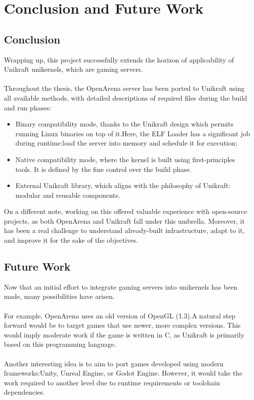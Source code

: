 \chapter{Conclusion and Future Work}
\label{chapter:fw&ll}
\section{Conclusion}
Wrapping up, this project successfully extends the horizon of applicability of Unikraft unikernels, which are gaming servers. \\ \\
Throughout the thesis, the OpenArena server has been ported to Unikraft using all available methods, with detailed descriptions of required files
during the build and run phases:
\begin{itemize}
    \item Binary compatibility mode, thanks to the Unikraft design which permits running Linux binaries on top of it.\@ Here,
    the ELF Loader has a significant job during runtime:\@ load the server into memory and schedule it for execution;
    \item Native compatibility mode, where the kernel is built using first-principles tools. It is defined by the fine control over the
    build phase.
    \item External Unikraft library, which aligns with the philosophy of Unikraft: modular and reusable components.
\end{itemize}
On a different note, working on this offered valuable experience with open-source projects, as both OpenArena and Unikraft fall under this umbrella.
Moreover, it has been a real challenge to understand already-built infrastructure, adapt to it, and improve it for the sake of the objectives. 
\section{Future Work}
Now that an initial effort to integrate gaming servers into unikernels has been made, many possibilities have arisen. \\ \\
For example, OpenArena uses an old version of OpenGL (1.3).\@ A natural step forward would be to target games that use newer, more complex versions.
This would imply moderate work if the game is written in C, as Unikraft is primarily based on this programming language. \\ \\
Another interesting idea is to aim to port games developed using modern frameworks:\@ Unity\cite{unity}, Unreal Engine\cite{unrealengine}, or
Godot Engine\cite{godotengine}. However, it would take the work required to another level due to runtime requirements or toolchain dependencies.
\label{fw}